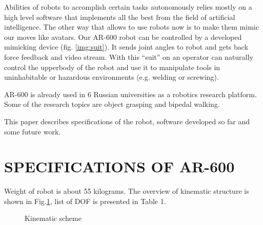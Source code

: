\documentclass[letterpaper, 10 pt, conference]{ieeeconf}  %
\begin{document}
Abilities of robots to accomplish certain tasks autonomously relies mostly on
a high level software that implements all the best from the field of artificial
intelligence. The other way that allows to use robots now is to make them mimic
our moves like avatars. Our AR-600 robot can be controlled by a developed
mimicking device (fig. \ref{img:suit}). It sends joint angles to robot and
gets back force feedback and video stream. With this ``suit'' on an
operator can naturally control the upperbody of the robot and use it to manipulate tools in uninhabitable or hazardous environments (e.g. welding or screwing).

AR-600 is already used in 6 Russian universities as a robotics research
platform. Some of the research topics are object grasping and bipedal walking.

This paper describes specifications of the robot, software developed so far and
some future work.
\section{SPECIFICATIONS OF AR-600}

Weight of robot is about 55 kilograms.
The overview of kinematic structure is shown in Fig.\ref{img:kinematic}, list of
DOF is presented in Table 1.
 \begin{figure}[thpb]
      \centering
      \caption{Kinematic scheme}
      \label{img:kinematic}
   \end{figure}
 
\end{document}
